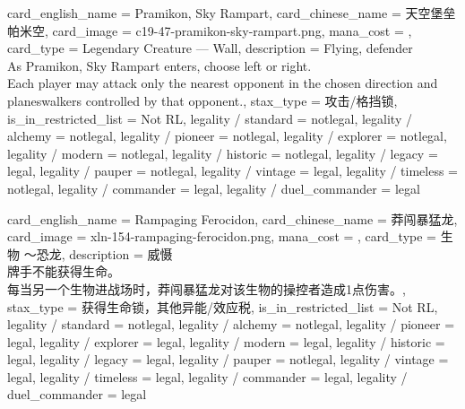 \documentclass[lang = cn, color = black, 10pt]{AllThatStax}
\begin{document}
\card
{
	card_english_name = {Pramikon, Sky Rampart},
	card_chinese_name = {天空堡垒帕米空},
	card_image = c19-47-pramikon-sky-rampart.png,
	mana_cost = ,
	card_type = Legendary Creature — Wall,
	description = {Flying, defender\\
		As Pramikon, Sky Rampart enters, choose left or right.\\
		Each player may attack only the nearest opponent in the chosen direction and planeswalkers controlled by that opponent.},
	stax_type = 攻击/格挡锁,
	is_in_restricted_list = Not RL,
	legality / standard = notlegal,
	legality / alchemy = notlegal,
	legality / pioneer = notlegal,
	legality / explorer = notlegal,
	legality / modern = notlegal,
	legality / historic = notlegal,
	legality / legacy = legal,
	legality / pauper = notlegal,
	legality / vintage = legal,
	legality / timeless = notlegal,
	legality / commander = legal,
	legality / duel_commander = legal
}

\card
{
	card_english_name = {Rampaging Ferocidon},
	card_chinese_name = {莽闯暴猛龙},
	card_image = xln-154-rampaging-ferocidon.png,
	mana_cost = ,
	card_type = 生物 ～恐龙,
	description = {威慑\\
		牌手不能获得生命。\\
		每当另一个生物进战场时，莽闯暴猛龙对该生物的操控者造成1点伤害。},
	stax_type = 获得生命锁，其他异能/效应税,
	is_in_restricted_list = Not RL,
	legality / standard = notlegal,
	legality / alchemy = notlegal,
	legality / pioneer = legal,
	legality / explorer = legal,
	legality / modern = legal,
	legality / historic = legal,
	legality / legacy = legal,
	legality / pauper = notlegal,
	legality / vintage = legal,
	legality / timeless = legal,
	legality / commander = legal,
	legality / duel_commander = legal
}
\end{document}
